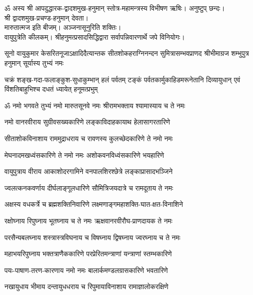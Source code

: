 
ॐ अस्य श्री आपदुद्धारक-द्वादशमुख-हनुमान् स्तोत्र-महामन्त्रस्य विभीषण ऋषिः। अनुष्टुप् छन्दः।\\
श्री द्वादशमुख-प्रचण्ड-हनुमान् देवता।\\
 मारुतात्मज इति बीजम्। अञ्जनासूनुरिति शक्तिः।\\
वायुपुत्रेति कीलकम्। श्रीहनुमत्प्रसादसिद्धिद्वारा सर्वापन्निवारणार्थे जपे विनियोगः।

{सूनो वायुकुमार केसरितनूजाऽक्षादिदैत्यान्तक}
{सीतशोकहराग्निनन्दन सुमित्रासम्भवप्राणद}
{श्रीभीमाग्रज शम्भुपुत्र हनुमान् सूर्यास्य तुभ्यं नमः}

{चक्रं शङ्ख-गदा-फलाङ्कुश-सुधाकुम्भान् हलं पर्वतम्}
{टङ्कं पर्वतकार्मुकाहिडमरूनेतानि दिव्यायुधान्}
{एवं विंशतिबाहुभिश्च दधतं ध्यायेत् हनूमत्प्रभुम्}


\twolineshloka
{ॐ नमो भगवते तुभ्यं नमो मारुतसूनवे}
{नमः श्रीरामभक्ताय श्यामास्याय च ते नमः}

\twolineshloka
{नमो वानरवीराय सुग्रीवसख्यकारिणे}
{लङ्काविदाहकायाथ हेलासागरतारिणे}

\twolineshloka
{सीताशोकविनाशाय राममुद्राधराय च}
{रावणस्य कुलच्छेदकारिणे ते नमो नमः}

\twolineshloka
{मेघनादमखध्वंसकारिणे ते नमो नमः}
{अशोकवनविध्वंसकारिणे भयहारिणे}

\twolineshloka
{वायुपुत्राय वीराय आकाशोदरगामिने}
{वनपालशिरश्छेत्रे लङ्काप्रासादभञ्जिने}

\twolineshloka
{ज्वलत्कनकवर्णाय दीर्घलाङ्गूलधारिणे}
{सौमित्रिजयदात्रे च रामदूताय ते नमः}

\twolineshloka
{अक्षस्य वधकर्त्रे च ब्रह्मशक्तिनिवारिणे}
{लक्ष्मणाङ्गमहाशक्ति-घात-क्षत-विनाशिने}

\twolineshloka
{रक्षोघ्नाय रिपुघ्नाय भूतघ्नाय च ते नमः}
{ऋक्षवानरवीरौघ-प्राणदायक ते नमः}

\twolineshloka
{परसैन्यबलघ्नाय शस्त्रास्त्रविघनाय च}
{विषघ्नाय द्विषघ्नाय ज्वरघ्नाय च ते नमः}

\twolineshloka
{महाभयरिपुघ्नाय भक्तत्राणैककारिणे}
{परप्रेरितमन्त्राणां यन्त्राणां स्तम्भकारिणे}

\twolineshloka
{पयः-पाषाण-तरण-कारणाय नमो नमः}
{बालार्कमण्डलग्रासकारिणे भवतारिणे}

\twolineshloka
{नखायुधाय भीमाय दन्तायुधधराय च}
{रिपुमायाविनाशाय रामाज्ञालोकरक्षिणे}


